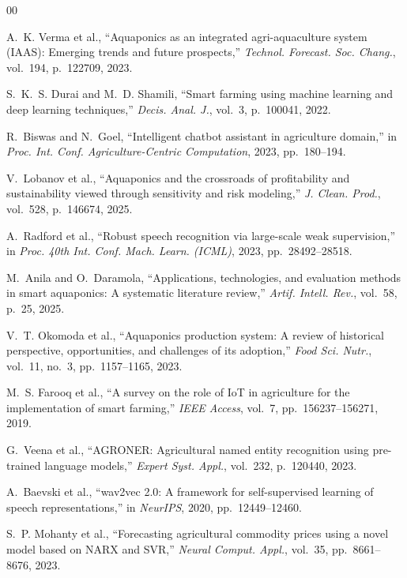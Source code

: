 \documentclass[conference]{IEEEtran}
\begin{document}
\begin{thebibliography}{00}

A.~K. Verma et al., ``Aquaponics as an integrated agri-aquaculture system ({IAAS}): Emerging trends and future prospects,'' \textit{Technol. Forecast. Soc. Chang.}, vol.~194, p.~122709, 2023.

S.~K.~S. Durai and M.~D. Shamili, ``Smart farming using machine learning and deep learning techniques,'' \textit{Decis. Anal. J.}, vol.~3, p.~100041, 2022.

R.~Biswas and N.~Goel, ``Intelligent chatbot assistant in agriculture domain,'' in \textit{Proc. Int. Conf. Agriculture-Centric Computation}, 2023, pp.~180--194.

V.~Lobanov et al., ``Aquaponics and the crossroads of profitability and sustainability viewed through sensitivity and risk modeling,'' \textit{J. Clean. Prod.}, vol.~528, p.~146674, 2025.

A.~Radford et al., ``Robust speech recognition via large-scale weak supervision,'' in \textit{Proc. 40th Int. Conf. Mach. Learn. (ICML)}, 2023, pp.~28492--28518.

M.~Anila and O.~Daramola, ``Applications, technologies, and evaluation methods in smart aquaponics: A systematic literature review,'' \textit{Artif. Intell. Rev.}, vol.~58, p.~25, 2025.

V.~T. Okomoda et al., ``Aquaponics production system: A review of historical perspective, opportunities, and challenges of its adoption,'' \textit{Food Sci. Nutr.}, vol.~11, no.~3, pp.~1157--1165, 2023.

M.~S. Farooq et al., ``A survey on the role of {IoT} in agriculture for the implementation of smart farming,'' \textit{IEEE Access}, vol.~7, pp.~156237--156271, 2019.

G.~Veena et al., ``AGRONER: Agricultural named entity recognition using pre-trained language models,'' \textit{Expert Syst. Appl.}, vol.~232, p.~120440, 2023.

A.~Baevski et al., ``wav2vec 2.0: A framework for self-supervised learning of speech representations,'' in \textit{NeurIPS}, 2020, pp.~12449--12460.

S.~P. Mohanty et al., ``Forecasting agricultural commodity prices using a novel model based on NARX and SVR,'' \textit{Neural Comput. Appl.}, vol.~35, pp.~8661--8676, 2023.


\end{thebibliography}
\end{document}
